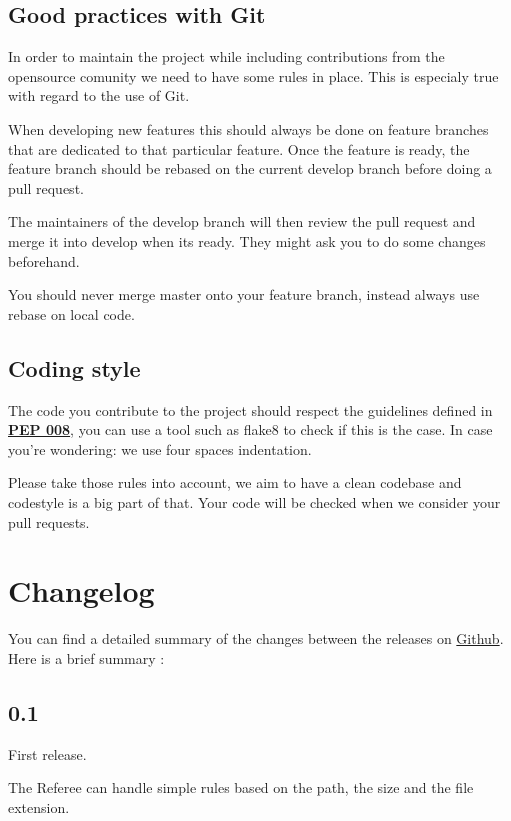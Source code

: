 \documentclass[letterpaper,10pt,english]{sphinxmanual}
\begin{document}
\subsection{Good practices with Git}
\label{contribute:good-practices-with-git}
In order to maintain the project while including contributions from the opensource comunity we need to have some rules in place. This is especialy true with regard to the use of Git.

When developing new features this should always be done on feature branches that are dedicated to that particular feature. Once the feature is ready, the feature branch should be rebased on the current develop branch before doing a pull request.

The maintainers of the develop branch will then review the pull request and merge it into develop when its ready. They might ask you to do some changes beforehand.

You should never merge master onto your feature branch, instead always use rebase on local code.


\subsection{Coding style}
\label{contribute:coding-style}
The code you contribute to the project should respect the guidelines defined in \href{http://www.python.org/dev/peps/pep-0008}{\textbf{PEP 008}}, you can use a tool such as flake8 to check if this is the case. In case you're wondering: we use four spaces indentation.

Please take those rules into account, we aim to have a clean codebase and codestyle is a big part of that. Your code will be checked when we consider your pull requests.


\section{Changelog}
\label{changelog::doc}\label{changelog:changelog}
You can find a detailed summary of the changes between the releases on \href{https://github.com/onitu/onitu/releases}{Github}. Here is a brief summary :


\subsection{0.1}
\label{changelog:id1}
First release.

The Referee can handle simple rules based on the path, the size and the file extension.
\end{document}
